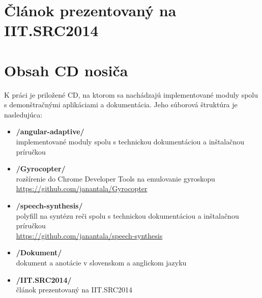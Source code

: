 
\section{Článok prezentovaný na IIT.SRC2014} %
\label{sec:_l_nok_prezentovan_na_iit_src2014}


\newpage

\section{Obsah CD nosiča} %
\label{sec:obsah_cd_nosi_a}
K práci je priložené CD, na ktorom sa nachádzajú implementované moduly spolu s demonštračnými aplikáciami a dokumentácia. Jeho súborová štruktúra je nasledujúca:

\begin{itemize}
  \item \textbf{/angular-adaptive/}\\
    implementované moduly spolu s technickou dokumentáciou a inštalačnou príručkou

  \item \textbf{/Gyrocopter/}\\
    rozšírenie do Chrome Developer Tools na emulovanie gyroskopu\\
    \url{https://github.com/janantala/Gyrocopter}

  \item \textbf{/speech-synthesis/}\\
    polyfill na syntézu reči spolu s technickou dokumentáciou a inštalačnou príručkou\\
    \url{https://github.com/janantala/speech-synthesis}

  \item \textbf{/Dokument/}\\
    dokument a anotácie v slovenskom a anglickom jazyku

  \item \textbf{/IIT.SRC2014/}\\
    článok prezentovaný na IIT.SRC2014

\end{itemize}

